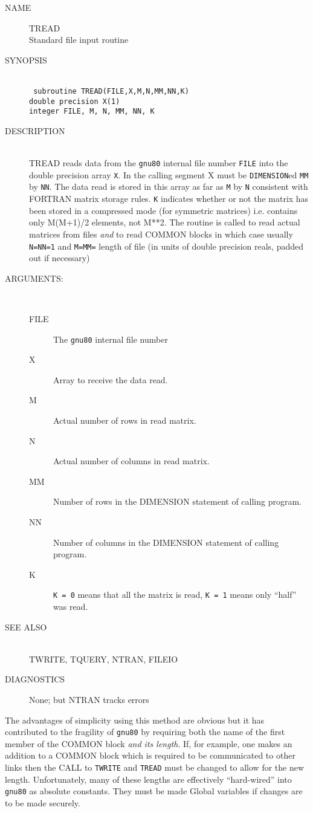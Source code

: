 \newpage
\begin{description}
\item[NAME] TREAD \\
Standard file input routine
\item[SYNOPSIS] \ \\
{\tt
   subroutine TREAD(FILE,X,M,N,MM,NN,K) \\
   double precision X(1) \\
   integer FILE, M, N, MM, NN, K \\
}
\item[DESCRIPTION] \ \\
TREAD reads data from the {\tt gnu80} internal file number {\tt FILE}
into the double precision array {\tt X}. In the calling segment
X must be {\tt DIMENSION}ed {\tt MM} by {\tt NN}. The data read
is stored in this array as far as {\tt M} by {\tt N} consistent
with FORTRAN matrix storage rules. {\tt K} indicates whether or
not the matrix has been stored in a compressed mode (for symmetric
matrices) i.e. contains only M(M+1)/2 elements, not M**2.
The routine is called to read actual matrices from files {\em and}
to read COMMON blocks in which case usually {\tt N=NN=1}
and {\tt M=MM=} length of file (in units of double precision reals,
padded out if necessary)
\item[ARGUMENTS:] \ \\
\begin{description}
\item[FILE]  The {\tt gnu80} internal file number
\item[X] Array to receive the data read.
\item[M] Actual number of rows in read matrix.
\item[N] Actual number of columns in read matrix.
\item[MM] Number of rows in the DIMENSION statement of calling program.
\item[NN] Number of columns in the DIMENSION statement of calling program.
\item[K] {\tt K = 0} means that all the matrix is read, {\tt K = 1}
means only ``half'' was read.
\end{description}
\item[SEE ALSO] \ \\
TWRITE, TQUERY, NTRAN, FILEIO
\item[DIAGNOSTICS]
None; but NTRAN tracks errors
\end{description}
\newpage
The advantages of simplicity using this method are obvious but it
has contributed to the fragility of {\tt gnu80} by requiring both
the name of the first member of the COMMON block {\em and its length}.
If, for example, one makes an addition to a COMMON block which is
required to be communicated to other links then the CALL to
{\tt TWRITE} and {\tt TREAD} must be changed to allow for the
new length. Unfortunately, many of these lengths are effectively
``hard-wired'' into {\tt gnu80} as absolute constants. They must
be made Global variables if changes are to be made securely.
